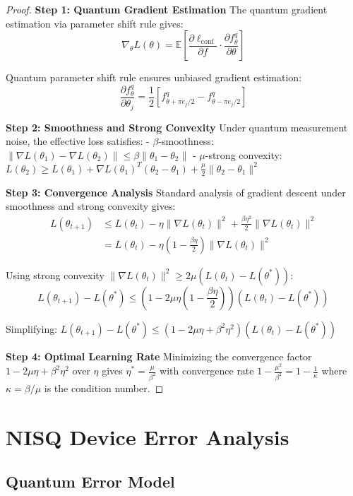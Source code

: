 \documentclass[11pt]{article}
\begin{document}
\begin{proof}
\textbf{Step 1: Quantum Gradient Estimation}
The quantum gradient estimation via parameter shift rule gives:
$$\nabla_\theta L(\theta) = \mathbb{E}\left[\frac{\partial \ell_{\text{conf}}}{\partial f} \cdot \frac{\partial f_\theta^q}{\partial \theta}\right]$$

Quantum parameter shift rule ensures unbiased gradient estimation:
$$\frac{\partial f_\theta^q}{\partial \theta_j} = \frac{1}{2}\left[f_{\theta+\pi e_j/2}^q - f_{\theta-\pi e_j/2}^q\right]$$

\textbf{Step 2: Smoothness and Strong Convexity}
Under quantum measurement noise, the effective loss satisfies:
- $\beta$-smoothness: $\|\nabla L(\theta_1) - \nabla L(\theta_2)\| \leq \beta \|\theta_1 - \theta_2\|$
- $\mu$-strong convexity: $L(\theta_2) \geq L(\theta_1) + \nabla L(\theta_1)^T(\theta_2 - \theta_1) + \frac{\mu}{2}\|\theta_2 - \theta_1\|^2$

\textbf{Step 3: Convergence Analysis}
Standard analysis of gradient descent under smoothness and strong convexity gives:
\begin{align}
L(\theta_{t+1}) &\leq L(\theta_t) - \eta \|\nabla L(\theta_t)\|^2 + \frac{\beta\eta^2}{2}\|\nabla L(\theta_t)\|^2 \\
&= L(\theta_t) - \eta\left(1 - \frac{\beta\eta}{2}\right)\|\nabla L(\theta_t)\|^2
\end{align}

Using strong convexity $\|\nabla L(\theta_t)\|^2 \geq 2\mu(L(\theta_t) - L(\theta^*))$:
$$L(\theta_{t+1}) - L(\theta^*) \leq \left(1 - 2\mu\eta\left(1 - \frac{\beta\eta}{2}\right)\right)(L(\theta_t) - L(\theta^*))$$

Simplifying: $L(\theta_{t+1}) - L(\theta^*) \leq (1 - 2\mu\eta + \beta^2\eta^2)(L(\theta_t) - L(\theta^*))$

\textbf{Step 4: Optimal Learning Rate}
Minimizing the convergence factor $1 - 2\mu\eta + \beta^2\eta^2$ over $\eta$ gives $\eta^* = \frac{\mu}{\beta^2}$ with convergence rate $1 - \frac{\mu^2}{\beta^2} = 1 - \frac{1}{\kappa}$ where $\kappa = \beta/\mu$ is the condition number.
\end{proof}

\section{NISQ Device Error Analysis}

\subsection{Quantum Error Model}
\end{document}
